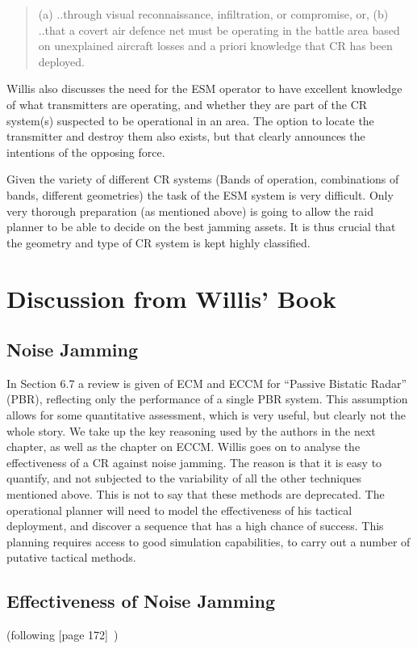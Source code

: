 \documentclass[english, 12pt]{report}
\begin{document}
\begin{quotation}
(a) ..through visual reconnaissance, infiltration, or compromise, or, (b) ..that a covert air defence net must be operating  in the battle area based on unexplained aircraft losses and a priori knowledge that CR has been deployed.
\end{quotation}

Willis also discusses the need for the ESM operator to have excellent knowledge of what transmitters are operating, and whether they are part of the CR system(s) suspected to be operational in an area. The option to locate the transmitter and destroy them also exists, but that clearly announces the intentions of the opposing force.

Given the variety of different CR systems (Bands of operation, combinations of bands, different geometries) the task of the ESM system is very difficult. Only very thorough preparation (as mentioned above) is going to allow the raid planner to be able to decide on the best jamming assets. It is thus crucial that the geometry and type of CR system is kept highly classified.

\section{Discussion from Willis' Book}
\subsection{Noise Jamming}

In Section 6.7 a review is given of ECM and ECCM for ``Passive Bistatic Radar'' (PBR), reflecting only the performance of a single PBR system. This assumption allows for some quantitative assessment, which is very useful, but clearly not the whole story. We take up the key reasoning used by the authors in the next chapter, as well as the chapter on ECCM. Willis goes on to analyse the effectiveness of a CR against noise jamming. The reason is that it is easy to quantify, and not subjected to the variability of all the other techniques mentioned above. This is not to say that these methods are deprecated. The operational planner will need to model the effectiveness of his tactical deployment, and discover a sequence that has a high chance of success. This planning requires access to good simulation capabilities, to carry out a number of putative tactical methods.


\subsection{Effectiveness of Noise Jamming}
 (following [page 172]~\cite{willis:07})
 
\end{document}
